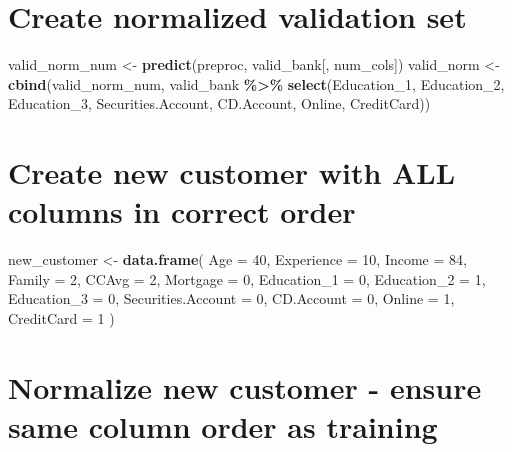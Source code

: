 \documentclass[
]{article}
\newenvironment{Shaded}{\begin{snugshade}}{\end{snugshade}}
\newcommand{\AttributeTok}[1]{\textcolor[rgb]{0.13,0.29,0.53}{#1}}
\newcommand{\DecValTok}[1]{\textcolor[rgb]{0.00,0.00,0.81}{#1}}
\newcommand{\FunctionTok}[1]{\textcolor[rgb]{0.13,0.29,0.53}{\textbf{#1}}}
\newcommand{\NormalTok}[1]{#1}
\newcommand{\OtherTok}[1]{\textcolor[rgb]{0.56,0.35,0.01}{#1}}
\newcommand{\SpecialCharTok}[1]{\textcolor[rgb]{0.81,0.36,0.00}{\textbf{#1}}}
\begin{document}
\section{Create normalized validation
set}\label{create-normalized-validation-set}

\begin{Shaded}
\begin{Highlighting}[]
\NormalTok{valid\_norm\_num }\OtherTok{\textless{}{-}} \FunctionTok{predict}\NormalTok{(preproc, valid\_bank[, num\_cols])}
\NormalTok{valid\_norm }\OtherTok{\textless{}{-}} \FunctionTok{cbind}\NormalTok{(valid\_norm\_num,}
\NormalTok{                   valid\_bank }\SpecialCharTok{\%\textgreater{}\%} \FunctionTok{select}\NormalTok{(Education\_1, Education\_2, Education\_3,}
\NormalTok{                                        Securities.Account, CD.Account, Online, CreditCard))}
\end{Highlighting}
\end{Shaded}

\section{Create new customer with ALL columns in correct
order}\label{create-new-customer-with-all-columns-in-correct-order}

\begin{Shaded}
\begin{Highlighting}[]
\NormalTok{new\_customer }\OtherTok{\textless{}{-}} \FunctionTok{data.frame}\NormalTok{(}
  \AttributeTok{Age =} \DecValTok{40}\NormalTok{, }\AttributeTok{Experience =} \DecValTok{10}\NormalTok{, }\AttributeTok{Income =} \DecValTok{84}\NormalTok{, }\AttributeTok{Family =} \DecValTok{2}\NormalTok{, }\AttributeTok{CCAvg =} \DecValTok{2}\NormalTok{, }\AttributeTok{Mortgage =} \DecValTok{0}\NormalTok{,}
  \AttributeTok{Education\_1 =} \DecValTok{0}\NormalTok{, }\AttributeTok{Education\_2 =} \DecValTok{1}\NormalTok{, }\AttributeTok{Education\_3 =} \DecValTok{0}\NormalTok{,}
  \AttributeTok{Securities.Account =} \DecValTok{0}\NormalTok{, }\AttributeTok{CD.Account =} \DecValTok{0}\NormalTok{, }\AttributeTok{Online =} \DecValTok{1}\NormalTok{, }\AttributeTok{CreditCard =} \DecValTok{1}
\NormalTok{)}
\end{Highlighting}
\end{Shaded}

\section{Normalize new customer - ensure same column order as
training}\label{normalize-new-customer---ensure-same-column-order-as-training}
\end{document}
